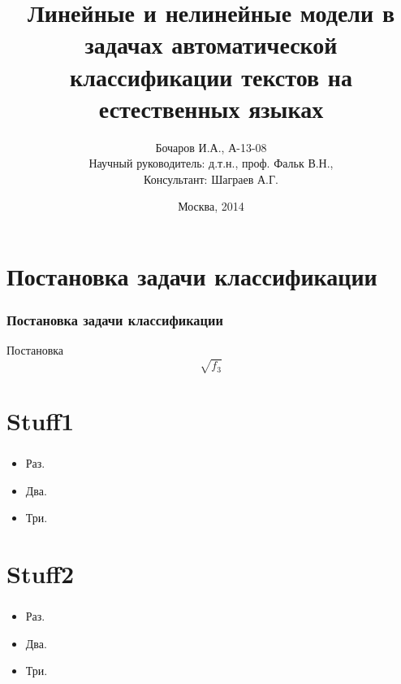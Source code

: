 \documentclass{beamer}
\begin{document}
\title[Линейные и нелинейные модели]{Линейные и нелинейные модели в задачах автоматической классификации текстов на естественных языках}  
\author[Бочаров И.А., А-13-08]{Бочаров И.А., А-13-08 \\Научный руководитель: д.т.н., проф. Фальк В.Н.,\\Консультант: Шаграев А.Г.}

\date{Москва, 2014} 
\begin{frame}[plain]
	\titlepage
\end{frame}
\begin{frame}
	\tableofcontents
\end{frame}


\section{Постановка задачи классификации}
\begin{frame}
\frametitle{Постановка задачи классификации}
Постановка $$\sqrt{f_3}$$

\end{frame}

\section{Stuff1}
\begin{frame}
\frametitle{}
\begin{itemize}
\item Раз.
\item Два.
\item Три.
\end{itemize}
\end{frame}

\section{Stuff2}
\begin{frame}
\frametitle{}
\begin{itemize}
\item Раз.
\item Два.
\item Три.
\end{itemize}
\end{frame}
\end{document}
